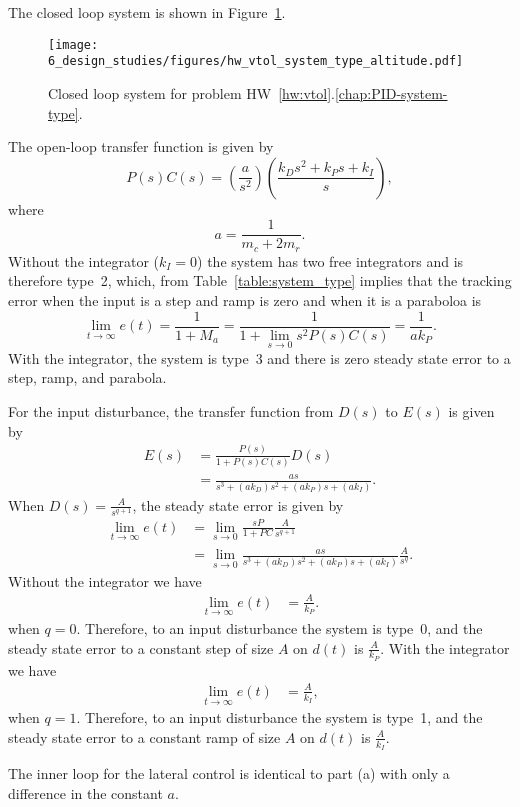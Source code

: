 The closed loop system is shown in Figure~\ref{fig:hw_vtol_system_type_altitude}.
\begin{figure}[H]
   \centering
   \texttt{[image: 6\_design\_studies/figures/hw\_vtol\_system\_type\_altitude.pdf]}
   \caption{Closed loop system for problem HW~\ref{hw:vtol}.\ref{chap:PID-system-type}.}
   \label{fig:hw_vtol_system_type_altitude}
\end{figure}

The open-loop transfer function is given by
\[
P(s)C(s) = \left(\frac{a}{s^2}\right)\left(\frac{k_D s^2  + k_Ps + k_I}{s}\right),
\]
where
\[
a = \frac{1}{m_c+2m_r}.
\]
Without the integrator ($k_I=0$) the system has two free integrators and is therefore type~2, which, from Table~\ref{table:system_type} implies that the tracking error when the input is a step and ramp is zero and when it is a paraboloa is 
\[
\lim_{t\to\infty}e(t) = \frac{1}{1+M_a} = \frac{1}{1+\lim_{s\to 0} s^2P(s)C(s)} = \frac{1}{ak_P}.
\]
With the integrator, the system is type~3 and there is zero steady state error to a step, ramp, and parabola.

For the input disturbance, the transfer function from $D(s)$ to $E(s)$ is given by
\begin{align*}
E(s) &= \frac{P(s)}{1+P(s)C(s)}D(s) \\
     &= \frac{as}{s^3+(ak_D)s^2+(ak_P)s+(ak_I)}.
\end{align*}
When $D(s)= \frac{A}{s^{q+1}}$, the steady state error is given by
\begin{align*}
\lim_{t\to\infty} e(t) &= \lim_{s\to 0} \frac{sP}{1+PC}\frac{A}{s^{q+1}} \\
&= \lim_{s\to 0} \frac{as}{s^3+(ak_D)s^2+(ak_P)s+(ak_I)}\frac{A}{s^q}.
\end{align*}
Without the integrator we have
\begin{align*}
\lim_{t\to\infty} e(t) &= \frac{A}{k_P}.
\end{align*}
when $q=0$. Therefore, to an input disturbance the system is type~0, and the steady state error to a constant step of size $A$ on $d(t)$ is $\frac{A}{k_P}$. With the integrator we have
\begin{align*}
\lim_{t\to\infty} e(t) &= \frac{A}{k_I},
\end{align*}
when $q=1$. Therefore, to an input disturbance the system is type~1, and the steady state error to a constant ramp of size $A$ on $d(t)$ is $\frac{A}{k_I}$.

The inner loop for the lateral control is identical to part (a) with only a difference in the constant $a$.

